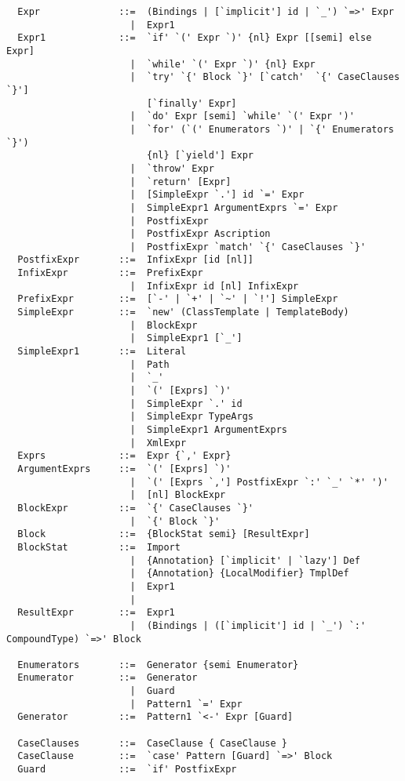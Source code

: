{\begin{lstlisting}
  Expr              ::=  (Bindings | [`implicit'] id | `_') `=>' Expr
                      |  Expr1
  Expr1             ::=  `if' `(' Expr `)' {nl} Expr [[semi] else Expr]
                      |  `while' `(' Expr `)' {nl} Expr
                      |  `try' `{' Block `}' [`catch'  `{' CaseClauses `}'] 
                         [`finally' Expr]
                      |  `do' Expr [semi] `while' `(' Expr ')'
                      |  `for' (`(' Enumerators `)' | `{' Enumerators `}') 
                         {nl} [`yield'] Expr
                      |  `throw' Expr
                      |  `return' [Expr]
                      |  [SimpleExpr `.'] id `=' Expr
                      |  SimpleExpr1 ArgumentExprs `=' Expr
                      |  PostfixExpr
                      |  PostfixExpr Ascription
                      |  PostfixExpr `match' `{' CaseClauses `}'
  PostfixExpr       ::=  InfixExpr [id [nl]]
  InfixExpr         ::=  PrefixExpr
                      |  InfixExpr id [nl] InfixExpr
  PrefixExpr        ::=  [`-' | `+' | `~' | `!'] SimpleExpr 
  SimpleExpr        ::=  `new' (ClassTemplate | TemplateBody)
                      |  BlockExpr
                      |  SimpleExpr1 [`_']
  SimpleExpr1       ::=  Literal
                      |  Path
                      |  `_'
                      |  `(' [Exprs] `)'
                      |  SimpleExpr `.' id 
                      |  SimpleExpr TypeArgs
                      |  SimpleExpr1 ArgumentExprs
                      |  XmlExpr
  Exprs             ::=  Expr {`,' Expr}
  ArgumentExprs     ::=  `(' [Exprs] `)'
                      |  `(' [Exprs `,'] PostfixExpr `:' `_' `*' ')'
                      |  [nl] BlockExpr
  BlockExpr         ::=  `{' CaseClauses `}'
                      |  `{' Block `}'
  Block             ::=  {BlockStat semi} [ResultExpr]
  BlockStat         ::=  Import
                      |  {Annotation} [`implicit' | `lazy'] Def
                      |  {Annotation} {LocalModifier} TmplDef
                      |  Expr1
                      |
  ResultExpr        ::=  Expr1
                      |  (Bindings | ([`implicit'] id | `_') `:' CompoundType) `=>' Block

  Enumerators       ::=  Generator {semi Enumerator}
  Enumerator        ::=  Generator
                      |  Guard
                      |  Pattern1 `=' Expr
  Generator         ::=  Pattern1 `<-' Expr [Guard]

  CaseClauses       ::=  CaseClause { CaseClause }
  CaseClause        ::=  `case' Pattern [Guard] `=>' Block 
  Guard             ::=  `if' PostfixExpr


\end{lstlisting}}
